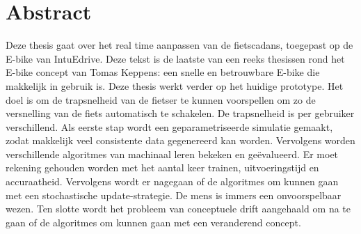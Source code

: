 \documentclass[12pt,a4paper,oneside]{book}
\makeatletter
\renewcommand{\algorithmcfname}{Algoritme}
\newcommand{\RemoveAlgoNumber}{\renewcommand{\fnum@algocf}{\AlCapSty{\AlCapFnt\algorithmcfname}}}
\makeatother
\begin{document}
\chapter{Abstract}
Deze thesis gaat over het real time aanpassen van de fietscadans, toegepast op de E-bike van IntuEdrive. Deze tekst is de laatste van een reeks thesissen rond het E-bike concept van Tomas Keppens: een snelle en betrouwbare E-bike die makkelijk in gebruik is. Deze thesis werkt verder op het huidige prototype. Het doel is om de trapsnelheid van de fietser te kunnen voorspellen om zo de versnelling van de fiets automatisch te schakelen. De trapsnelheid is per gebruiker verschillend. Als eerste stap wordt een geparametriseerde simulatie gemaakt, zodat makkelijk veel consistente data gegenereerd kan worden. Vervolgens worden verschillende algoritmes van machinaal leren bekeken en geëvalueerd. Er moet rekening gehouden worden met het aantal keer trainen, uitvoeringstijd en accuraatheid. Vervolgens wordt er nagegaan of de algoritmes om kunnen gaan met een stochastische update-strategie. De mens is immers een onvoorspelbaar wezen. Ten slotte wordt het probleem van conceptuele drift aangehaald om na te gaan of de algoritmes om kunnen gaan met een veranderend concept.

\tableofcontents
\newpage
\listoffigures
{}
\listoftables
{}
\newpage
\printglossary[type=\acronymtype ,title=Lijst van afkortingen ,style=mystyle]
\newpage
{}
\printglossary[title=Lijst van symbolen,style=mystyle]

\mainmatter
{}
\RemoveAlgoNumber







\end{document}
